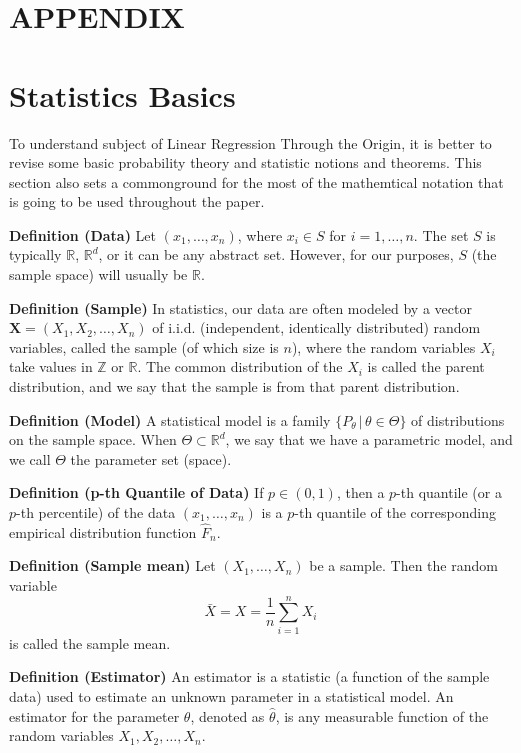 \documentclass[12pt,a4paper,oneside]{book} %
\begin{document}
	\section{APPENDIX} 



	\section{Statistics Basics}



	To understand subject of Linear Regression Through the Origin, it is better to revise some basic probability theory and statistic notions and theorems. This section also sets a commonground for the most of the mathemtical notation that is going to be used throughout the paper.

\textbf{Definition (Data)} Let $(x_1, \ldots, x_n)$, where $x_i \in S$ for $i = 1, \ldots, n$. The set $S$ is typically $\mathbb{R}$, $\mathbb{R}^d$, or it can be any abstract set. However, for our purposes, $S$ (the sample space) will usually be $\mathbb{R}$.

\textbf{Definition (Sample)} In statistics, our data are often modeled by a vector $\mathbf{X} = (X_1, X_2, \ldots, X_n)$ of i.i.d. (independent, identically distributed) random variables, called the sample (of which size is $n$), where the random variables $X_i$ take values in $\mathbb{Z}$ or $\mathbb{R}$. The common distribution of the $X_i$ is called the parent distribution, and we say that the sample is from that parent distribution.	

\textbf{Definition (Model)} A statistical model is a family $\{P_{\theta} \,|\, \theta \in \Theta\}$ of distributions on the sample space. When $\Theta \subset \mathbb{R}^d$, we say that we have a parametric model, and we call $\Theta$ the parameter set (space).

\textbf{Definition (p-th Quantile of Data)} If $p \in (0, 1)$, then a $p$-th quantile (or a $p$-th percentile) of the data $(x_1, \ldots, x_n)$ is a $p$-th quantile of the corresponding empirical distribution function $\hat{F}_n$.

\textbf{Definition (Sample mean)} Let $(X_1, \ldots, X_n)$ be a sample. Then the random variable
\[ \bar{X} = X = \frac{1}{n} \sum_{i=1}^{n} X_i \]
is called the sample mean.

\textbf{Definition (Estimator)} An estimator is a statistic (a function of the sample data) used to estimate an unknown parameter in a statistical model. An estimator for the parameter $\theta$, denoted as $\hat{\theta}$, is any measurable function of the random variables $X_1, X_2, \ldots, X_n$.
\end{document}
